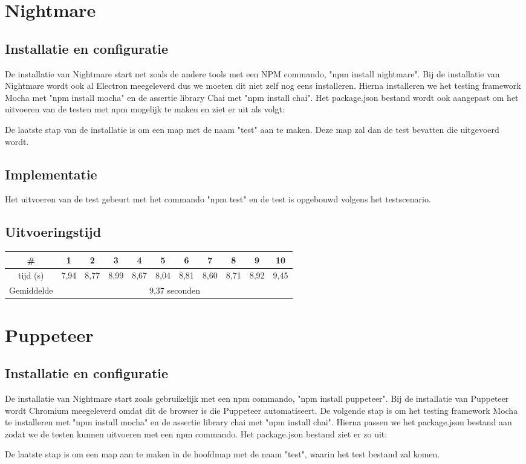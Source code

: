 \section{Nightmare}
\subsection{Installatie en configuratie}
De installatie van Nightmare start net zoals de andere tools met een NPM commando, "npm install nightmare". Bij de installatie van Nightmare wordt ook al Electron meegeleverd dus we moeten dit niet zelf nog eens installeren. Hierna installeren we het testing framework Mocha met "npm install mocha" en de assertie library Chai met "npm install chai". Het package.json bestand wordt ook aangepast om het uitvoeren van de testen met npm mogelijk te maken en ziet er uit als volgt:

De laatste stap van de installatie is om een map met de naam "test" aan te maken. Deze map zal dan de test bevatten die uitgevoerd wordt.
\subsection{Implementatie}
Het uitvoeren van de test gebeurt met het commando "npm test" en de test is opgebouwd volgens het testscenario.

\subsection{Uitvoeringstijd}

\begin{center}
\begin{tabular}{ |c| |c |c |c |c |c |c |c |c |c |c| }
\hline
	\# & 1 & 2 & 3 & 4 & 5 & 6 & 7 & 8 & 9 & 10\\
\hline
	tijd (s) & 7,94 & 8,77 & 8,99 & 8,67 & 8,04 & 8,81 & 8,60 & 8,71 & 8,92 & 9,45\\
\hline
 Gemiddelde & \multicolumn{10}{c|}{9,37 seconden}\\
\hline
\end{tabular}
\end{center}

\section{Puppeteer}
\subsection{Installatie en configuratie}
De installatie van Nightmare start zoals gebruikelijk met een npm commando, "npm install puppeteer". Bij de installatie van Puppeteer wordt Chromium meegeleverd omdat dit de browser is die Puppeteer automatiseert. De volgende stap is om het testing framework Mocha te installeren met "npm install mocha" en de assertie library chai met "npm install chai". Hierna passen we het package.json bestand aan zodat we de testen kunnen uitvoeren met een npm commando. Het package.json bestand ziet er zo uit:

De laatste stap is om een map aan te maken in de hoofdmap met de naam "test", waarin het test bestand zal komen.
